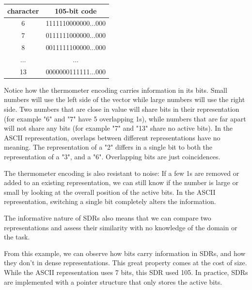 \documentclass{article}
\begin{document}
\begin{center}
\label{tab:sdr}
 \begin{tabular}{||c c||} 
 \hline
 character & 105-bit code \\ [0.5ex] 
 \hline\hline
 6 & 1111110000000...000 \\
 \hline
 7 & 0111111000000...000 \\
 \hline
 8 & 0011111100000...000 \\
 \hline
 $\dots$ & $\dots$\\
 \hline
 13 & 0000000111111...000 \\
 \hline
\end{tabular}
\end{center}

Notice how the thermometer encoding carries information in its bits. Small numbers will use the left side of the vector while large numbers will use the right side. Two numbers that are close in value will share bits in their representation (for example "6" and "7" have 5 overlapping 1s), while numbers that are far apart will not share any bits (for example "7" and "13" share no active bits).
In the ASCII representation, overlaps between different representations have no meaning. The representation of a "2" differs in a single bit to both the representation of a "3", and a "6". Overlapping bits are just coincidences. 

The thermometer encoding is also resistant to noise: If a few 1s are removed or added to an existing representation, we can still know if the number is large or small by looking at the overall position of the active bits. In the ASCII representation, switching a single bit completely alters the information.

The informative nature of SDRs also means that we can compare two representations and assess their similarity with no knowledge of the domain or the task.

From this example, we can observe how bits carry information in SDRs, and how they don't in dense representations.
This great property comes at the cost of size. While the ASCII representation uses 7 bits, this SDR used 105. In practice, SDRs are implemented with a pointer structure that only stores the active bits.

\end{document}
